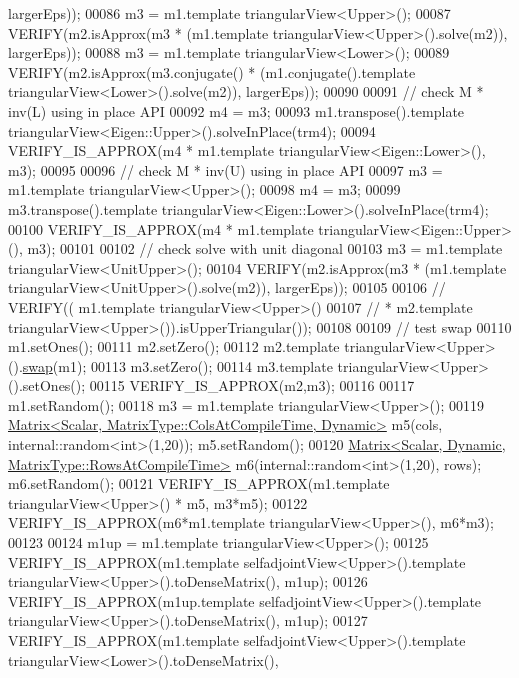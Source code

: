\begin{DoxyCode}
      largerEps));
00086   m3 = m1.template triangularView<Upper>();
00087   VERIFY(m2.isApprox(m3 * (m1.template triangularView<Upper>().solve(m2)), largerEps));
00088   m3 = m1.template triangularView<Lower>();
00089   VERIFY(m2.isApprox(m3.conjugate() * (m1.conjugate().template triangularView<Lower>().solve(m2)), 
      largerEps));
00090 
00091   \textcolor{comment}{// check M * inv(L) using in place API}
00092   m4 = m3;
00093   m1.transpose().template triangularView<Eigen::Upper>().solveInPlace(trm4);
00094   VERIFY\_IS\_APPROX(m4 * m1.template triangularView<Eigen::Lower>(), m3);
00095 
00096   \textcolor{comment}{// check M * inv(U) using in place API}
00097   m3 = m1.template triangularView<Upper>();
00098   m4 = m3;
00099   m3.transpose().template triangularView<Eigen::Lower>().solveInPlace(trm4);
00100   VERIFY\_IS\_APPROX(m4 * m1.template triangularView<Eigen::Upper>(), m3);
00101 
00102   \textcolor{comment}{// check solve with unit diagonal}
00103   m3 = m1.template triangularView<UnitUpper>();
00104   VERIFY(m2.isApprox(m3 * (m1.template triangularView<UnitUpper>().solve(m2)), largerEps));
00105 
00106 \textcolor{comment}{//   VERIFY((  m1.template triangularView<Upper>()}
00107 \textcolor{comment}{//           * m2.template triangularView<Upper>()).isUpperTriangular());}
00108 
00109   \textcolor{comment}{// test swap}
00110   m1.setOnes();
00111   m2.setZero();
00112   m2.template triangularView<Upper>().\hyperlink{endian_8c_a3ca5ecd34b04d6a243c054ac3a57f68d}{swap}(m1);
00113   m3.setZero();
00114   m3.template triangularView<Upper>().setOnes();
00115   VERIFY\_IS\_APPROX(m2,m3);
00116   
00117   m1.setRandom();
00118   m3 = m1.template triangularView<Upper>();
00119   \hyperlink{group___core___module_class_eigen_1_1_matrix}{Matrix<Scalar, MatrixType::ColsAtCompileTime, Dynamic>}
       m5(cols, internal::random<int>(1,20));  m5.setRandom();
00120   \hyperlink{group___core___module_class_eigen_1_1_matrix}{Matrix<Scalar, Dynamic, MatrixType::RowsAtCompileTime>}
       m6(internal::random<int>(1,20), rows);  m6.setRandom();
00121   VERIFY\_IS\_APPROX(m1.template triangularView<Upper>() * m5, m3*m5);
00122   VERIFY\_IS\_APPROX(m6*m1.template triangularView<Upper>(), m6*m3);
00123 
00124   m1up = m1.template triangularView<Upper>();
00125   VERIFY\_IS\_APPROX(m1.template selfadjointView<Upper>().template triangularView<Upper>().toDenseMatrix(), 
      m1up);
00126   VERIFY\_IS\_APPROX(m1up.template selfadjointView<Upper>().template triangularView<Upper>().toDenseMatrix(),
       m1up);
00127   VERIFY\_IS\_APPROX(m1.template selfadjointView<Upper>().template triangularView<Lower>().toDenseMatrix(), 

\end{DoxyCode}
